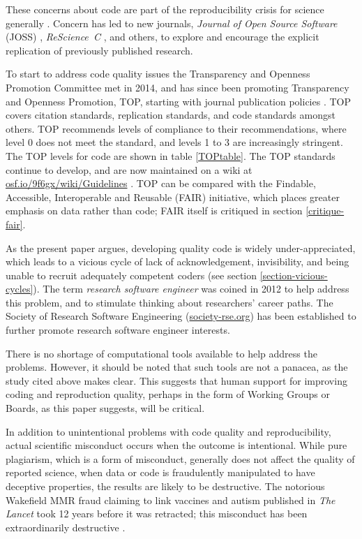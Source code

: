 \documentclass{comjnl}
\begin{document}
These concerns about code are part of the reproducibility crisis for science generally \cite{machine-learning-reproducibility,no-raw-data,data-access,reproducible-manifesto,reproducibility-crisis}. Concern has led to new journals, \emph{Journal of Open Source Software\/} (JOSS) \cite{joss}, \emph{ReScience~C\/} \cite{rescience}, and  others, to explore and encourage the explicit replication of previously published research. 

To start to address code quality issues the Transparency and Openness Promotion Committee met in 2014, and has since been promoting Transparency and Openness Promotion, TOP, starting with journal publication policies \cite{TOP}. TOP covers citation standards, replication standards, and code standards amongst others. TOP recommends levels of compliance to their recommendations, where level 0 does not meet the standard, and levels 1 to 3 are increasingly stringent. The TOP levels for code are shown in table \ref{TOPtable}. The TOP standards continue to develop, and are now maintained on a wiki at \url{osf.io/9f6gx/wiki/Guidelines} \cite{TOP-wiki}. TOP can be compared with the Findable, Accessible, Interoperable and Reusable (FAIR) initiative, which places greater emphasis on data rather than code; FAIR itself is critiqued in section \ref{critique-fair}.

As the present paper argues, developing quality code is widely under-appreciated, which leads to a vicious cycle of lack of acknowledgement, invisibility, and being unable to recruit adequately competent coders (see section \ref{section-vicious-cycles}). The term \emph{research software engineer\/} was coined in 2012 to help address this problem, and to stimulate thinking about researchers' career paths. The Society of Research Software Engineering (\url{society-rse.org}) has been established to further promote research software engineer interests.  

There is no shortage of computational tools available to help address the problems. However, it should be noted that such tools are not a panacea, as the study \cite{jupyter-study} cited above makes clear. This suggests that human support for improving coding and reproduction quality, perhaps in the form of Working Groups or Boards, as this paper suggests, will be critical.

In addition to unintentional problems with code quality and reproducibility, actual scientific misconduct occurs when the outcome is intentional. While pure plagiarism, which is a form of misconduct, generally does not affect the quality of reported science, when data or code is fraudulently manipulated to have deceptive properties, the results are likely to be destructive. The notorious Wakefield MMR fraud claiming to link vaccines and autism published in \emph{The Lancet\/} took 12 years before it was retracted; this misconduct has been extraordinarily destructive \cite{MMR-fraud}. 
\end{document}
